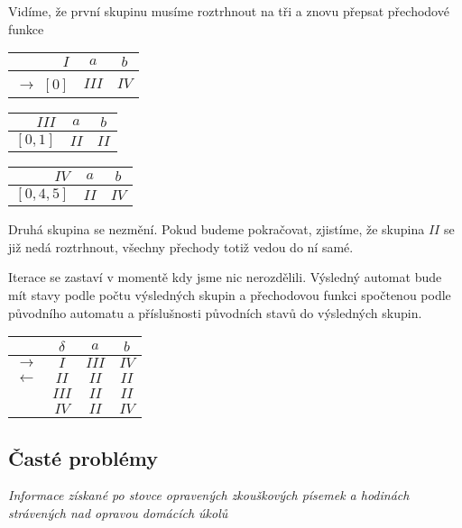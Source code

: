 \documentclass{article}
\begin{document}
Vidíme, že první skupinu musíme roztrhnout na tři a znovu přepsat přechodové funkce

\begin{tabular}{|r||c|c|}
\hline
 $I$ &      $a$ &   $b$       \\
\hline
\hline
$\rightarrow$ $[0]$ &   $III$ &  $IV$\\
\hline
\end{tabular}

\begin{tabular}{|r||c|c|}
\hline
 $III$ &      $a$ &   $b$       \\
\hline
\hline
$[0,1]$ &       $II$ & $II$\\
\hline
\end{tabular}

\begin{tabular}{|r||c|c|}
\hline
 $IV$ &      $a$ &   $b$       \\
\hline
\hline
$[0,4,5]$ &     $II$ &     $IV$\\
\hline
\end{tabular}

Druhá skupina se nezmění. Pokud budeme pokračovat, zjistíme, že skupina $II$ se již nedá roztrhnout, všechny přechody totiž vedou do ní samé.

Iterace se zastaví v momentě kdy jsme nic nerozdělili. Výsledný automat bude mít stavy podle počtu výsledných skupin a přechodovou funkci spočtenou podle původního automatu a příslušnosti původních stavů do výsledných skupin.



\begin{tabular}{|rc||c|c|}
\hline
              &  $\delta$   &   $a$   & $b$\\
\hline
$\rightarrow$ & $I$     &   $III$ & $IV$\\
$\leftarrow$  & $II$      &   $II$  & $II$\\
              & $III$     &   $II$  & $II$\\
              & $IV$ &   $II$  & $IV$\\
\hline
\end{tabular}

\subsection{Časté problémy}

\emph{Informace získané po stovce opravených zkouškových písemek a hodinách strávených nad opravou domácích úkolů}
\end{document}
